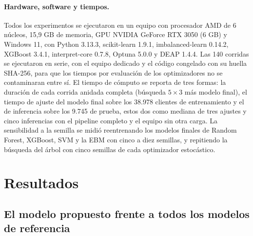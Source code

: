 \documentclass[pdflatex,sn-mathphys-num]{sn-jnl}
\begin{document}
\paragraph{Hardware, software y tiempos.}
Todos los experimentos se ejecutaron en un equipo con procesador AMD de 6 núcleos, 15,9 GB de memoria, GPU NVIDIA GeForce RTX 3050 (6 GB) y Windows 11, con Python 3.13.3, scikit-learn 1.9.1, imbalanced-learn 0.14.2, XGBoost 3.4.1, interpret-core 0.7.8, Optuna 5.0.0 y DEAP 1.4.4. Las 140 corridas se ejecutaron en serie, con el equipo dedicado y el código congelado con su huella SHA-256, para que los tiempos por evaluación de los optimizadores no se contaminaran entre sí. El tiempo de cómputo se reporta de tres formas: la duración de cada corrida anidada completa (búsqueda $5\times3$ más modelo final), el tiempo de ajuste del modelo final sobre los 38.978 clientes de entrenamiento y el de inferencia sobre los 9.745 de prueba, estos dos como mediana de tres ajustes y cinco inferencias con el pipeline completo y el equipo sin otra carga. La sensibilidad a la semilla se midió reentrenando los modelos finales de Random Forest, XGBoost, SVM y la EBM con cinco a diez semillas, y repitiendo la búsqueda del árbol con cinco semillas de cada optimizador estocástico.

\section{Resultados}\label{sec:resultados}

\subsection{El modelo propuesto frente a todos los modelos de referencia}\label{sec:res_todos}
\end{document}
